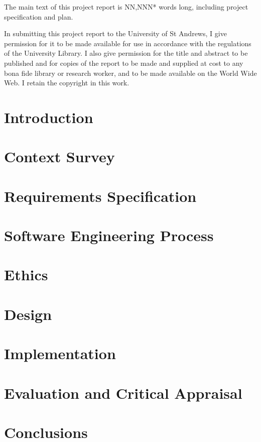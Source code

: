 \documentclass{IEEEtran}
\begin{document}
The main text of this project report is  NN,NNN* words long, including project specification and plan.

In submitting this project report to the University of
St Andrews, I give permission for it to be made
available for use in accordance with the regulations of
the University Library. I also give permission for
the title and abstract to be published and for copies of
the report to be made and supplied at cost to any bona
fide library or research worker, and to be made
available on the World Wide Web. I retain the
copyright in this work.

\section{Introduction}

\section{Context Survey}

\section{Requirements Specification}

\section{Software Engineering Process}

\section{Ethics}

\section{Design}

\section{Implementation}

\section{Evaluation and Critical Appraisal}

\section{Conclusions}


\nocite{*}
\printbibliography
\end{document}
